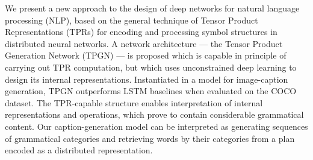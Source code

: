 We present a new approach to the design of deep networks for natural language processing (NLP), based on the general technique of Tensor Product Representations (TPRs) for encoding and processing symbol structures in distributed neural networks. A network architecture --- the Tensor Product Generation Network (TPGN) --- is proposed which is capable in principle of carrying out TPR computation, but which uses unconstrained deep learning to design its internal representations. Instantiated in a model for image-caption generation, TPGN outperforms LSTM baselines when evaluated on the COCO dataset. The TPR-capable structure enables interpretation of internal representations and operations, which prove to contain considerable grammatical content. Our caption-generation model can be interpreted as generating sequences of grammatical categories and retrieving words by their categories from a plan encoded as a distributed representation.

